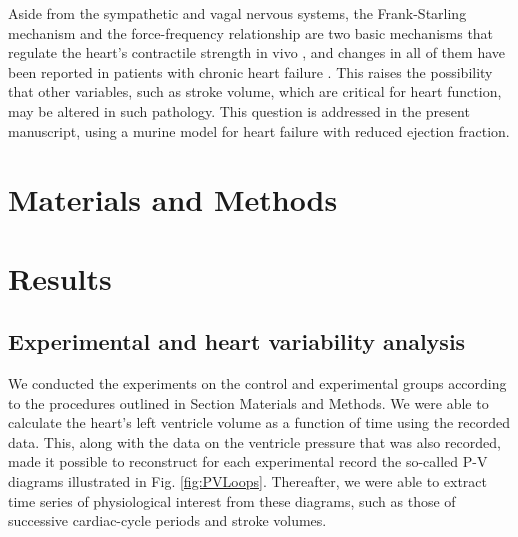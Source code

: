 \documentclass[%
preprint,
 amsmath,amssymb,
 aps,
]{revtex4-2}
\begin{document}
Aside from the sympathetic and vagal nervous systems, the Frank-Starling mechanism and the force-frequency relationship are two basic mechanisms that regulate the heart's contractile strength in vivo \citep{Holubarsch_1996} , and changes in all of them have been reported in patients with chronic heart failure \citep{Mulieri_1992, Pieske_1992, Bristow_1982, Bristow_1989, Holubarsch_1996}. This raises the possibility that other variables, such as stroke volume, which are critical for heart function, may be altered in such pathology. This question is addressed in the present manuscript, using a murine model for heart failure with reduced ejection fraction.

\section{\label{sec:meth}Materials and Methods}

\section{\label{sec:res}Results}

\subsection{\label{sec:conclu}Experimental and heart variability analysis}

We conducted the experiments on the control and experimental groups according to the procedures outlined in Section Materials and Methods. We were able to calculate the heart's left ventricle volume as a function of time using the recorded data. This, along with the data on the ventricle pressure that was also recorded, made it possible to reconstruct for each experimental record the so-called P-V diagrams illustrated in Fig. \ref{fig:PVLoops}. Thereafter, we were able to extract time series of physiological interest from these diagrams, such as those of successive cardiac-cycle periods and stroke volumes.
\end{document}
